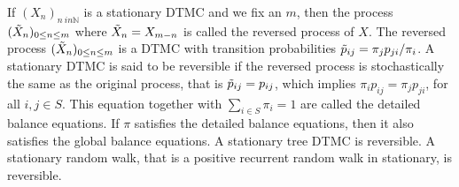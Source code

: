  If $(X_n)_{n\ in \mathbb{N}}$ is a stationary DTMC and we fix an $m$, then the process $(\Tilde{X}_n)_{0 \le n \le m}$ where $\Tilde{X}_n = X_{m-n}$ is called the reversed process of $X$.
 The reversed process $(\Tilde{X}_n)_{0 \le n \le m}$ is a DTMC with transition probabilities $\Tilde{p}_{ij} = \pi_j p_{ji}/\pi_i$.
 A stationary DTMC is said to be reversible if the reversed process is stochastically the same as the original process, that is $\Tilde{p}_{ij} = p_{ij}$, which implies $\pi_i p_{ij} = \pi_j p_{ji}$, for all $i,j \in S$. This equation together with $\sum_{i \in S} \pi_i = 1$ are called the detailed balance equations. 
 If $\pi$ satisfies the detailed balance equations, then it also satisfies the global balance equations.
 A stationary tree DTMC is reversible.
 A stationary random walk, that is a positive recurrent random walk in stationary, is reversible.